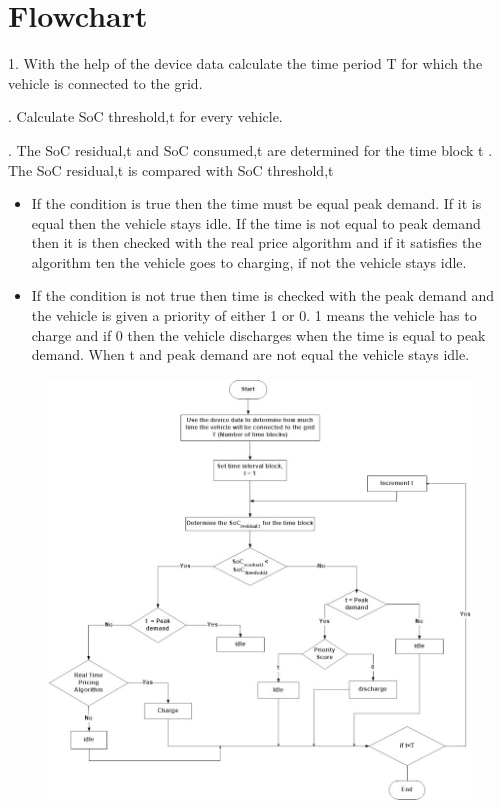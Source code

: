 	\section{Flowchart}
	
	1. With the help of the device data calculate the time period T for which the vehicle is
	connected to the grid.
	
	. Calculate SoC threshold,t for every vehicle.
	
	. The SoC residual,t and SoC consumed,t are determined for the time block t
	. The SoC residual,t is compared with SoC threshold,t
	\begin{itemize}


	 \item If the condition is true then the time must be equal peak demand. If it is equal then
	the vehicle stays idle. If the time is not equal to peak demand then it is then
	checked with the real price algorithm and if it satisfies the algorithm ten the
	vehicle goes to charging, if not the vehicle stays idle.
	
	\item If the condition is not true then time is checked with the peak demand and the
	vehicle is given a priority of either 1 or 0. 1 means the vehicle has to charge and if
	0 then the vehicle discharges when the time is equal to peak demand. When t and
	peak demand are not equal the vehicle stays idle.
	
		\end{itemize}
	
	\begin{figure}
		\centering
		\includegraphics[width=0.9\linewidth]{Figures/Ev_flowchart}
		\caption{}
		\label{fig:evflowchart}
	\end{figure}


